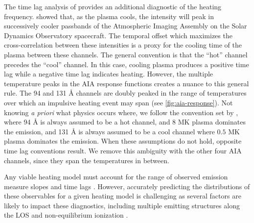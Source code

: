 The time lag analysis of \citet{viall_evidence_2012} provides an additional diagnostic of the heating frequency. \citet{viall_patterns_2011} showed that, as the plasma cools, the intensity will peak in successively cooler passbands of the Atmospheric Imaging Assembly \citep[AIA,][]{lemen_atmospheric_2012} on the Solar Dynamics Observatory \citep[SDO,][]{pesnell_solar_2012} spacecraft.
The temporal offset which maximizes the cross-correlation between these intensities is a proxy for the cooling time of the plasma between these channels.
The general convention is that the ``hot'' channel precedes the ``cool'' channel.
In this case, cooling plasma produces a positive time lag while a negative time lag indicates heating.
However, the multiple temperature peaks in the AIA response functions creates a nuance to this general rule.
The 94 and 131 \AA{} channels are doubly peaked in the range of temperatures over which an impulsive heating event may span (see \autoref{fig:aia-response}).
Not knowing \textit{a priori} what physics occurs where, we follow the convention set by \citet{viall_evidence_2012}, where 94 \AA{} is always assumed to be a hot channel, and $8$ MK plasma dominates the emission, and 131 \AA{} is always assumed to be a cool channel where $0.5$ MK plasma dominates the emission.
When these assumptions do not hold, opposite time lag conventions result.
We remove this ambiguity with the other four AIA channels, since they span the temperatures in between. 

Any viable heating model must account for the range of observed emission measure slopes and time lags \citep[ hereafter]{viall_survey_2017}.
However, accurately predicting the distributions of these observables for a given heating model is challenging as several factors are likely to impact these diagnostics, including multiple emitting structures along the LOS and non-equilibrium ionization \citep[e.g.][]{barnes_inference_2016}.

